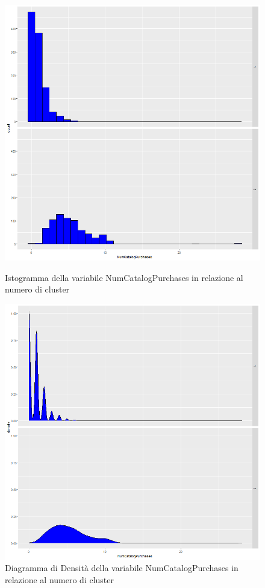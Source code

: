 \documentclass[letterpaper,11pt]{article}
\begin{document}
\begin{figure}[!htb]
   \begin{minipage}{0.48\textwidth}
     \centering
         \includegraphics[width=1\textwidth]{Img/K-MEANS/KMEANS016.png}
    \caption{Istogramma della variabile NumCatalogPurchases in relazione al numero di cluster}
    \label{fig:NumCatalogPurchasesKmeansHistogram}
   \end{minipage}\hfill
   \begin{minipage}{0.48\textwidth}
     \centering
     \includegraphics[width=1\linewidth]{Img/K-MEANS/KMEANS017.png}
     \caption{Diagramma di Densità della variabile NumCatalogPurchases in relazione al numero di cluster}\label{fig:NumCatalogPurchasesKmeansDensity}
   \end{minipage}
\end{figure}
\end{document}
